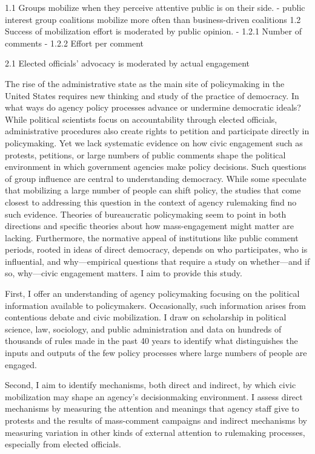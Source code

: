 

1.1 Groups mobilize when they perceive attentive public is on their side.
- public interest group coalitions mobilize more often than business-driven coalitions
1.2 Success of mobilization effort is moderated by public opinion. 
- 1.2.1 Number of comments 
- 1.2.2 Effort per comment 

2.1 Elected officials' advocacy is moderated by actual engagement





The rise of the administrative state as the main site of policymaking in the United States requires new thinking and study of the practice of democracy. In what ways do agency policy processes advance or undermine democratic ideals? While political scientists focus on accountability through elected officials, administrative procedures also create rights to petition and participate directly in policymaking.  Yet we lack systematic evidence on how civic engagement such as protests, petitions, or large numbers of public comments shape the political environment in which government agencies make policy decisions. Such questions of group influence are central to understanding democracy. While some speculate that mobilizing a large number of people can shift policy, the studies that come closest to addressing this question in the context of agency rulemaking find no such evidence. Theories of bureaucratic policymaking seem to point in both directions and specific theories about how mass-engagement might matter are lacking. Furthermore, the normative appeal of institutions like public comment periods, rooted in ideas of direct democracy, depends on who participates, who is influential, and why---empirical questions that require a study on whether---and if so, why---civic engagement matters. I aim to provide this study.

First, I offer an understanding of agency policymaking focusing on the political information available to policymakers. Occasionally, such information arises from contentious debate and civic mobilization. I draw on scholarship in political science, law, sociology, and public administration and data on hundreds of thousands of rules made in the past 40 years to identify what distinguishes the inputs and outputs of the few policy processes where large numbers of people are engaged.

Second, I aim to identify mechanisms, both direct and indirect, by which civic mobilization may shape an agency's decisionmaking environment. I assess direct mechanisms by measuring the attention and meanings that agency staff give to protests and the results of mass-comment campaigns and indirect mechanisms by measuring variation in other kinds of external attention to rulemaking processes, especially from elected officials.

